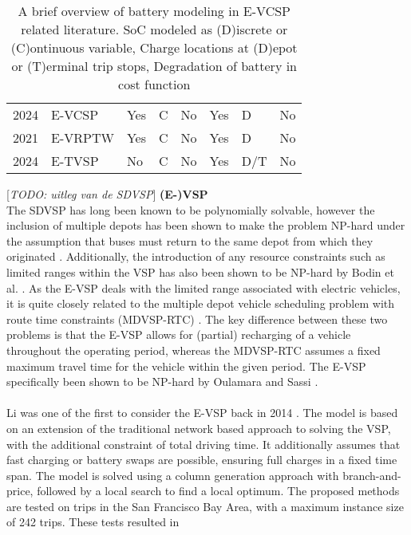 \documentclass[]{article}
\newcommand{\todo}[1]{{\color{red}[\textit{TODO: #1}]}}
\begin{document}
\begin{table}[]
\begin{tabular}{clllllll}
    \citet{Cong2024} 2024             & E-VCSP  & Yes & C   & No            & Yes         & D            & No          \\
    \addlinespace[0.4em]
    \citet{Ham2021} 2021              & E-VRPTW & Yes & C   & No            & Yes         & D            & No          \\
    \citet{Stadnichuk2024} 2024       & E-TVSP  & No  & C   & No            & Yes         & D/T          & No          \\
    \bottomrule
  \end{tabular}
  \caption{A brief overview of battery modeling in E-VCSP related literature. SoC modeled as (D)iscrete or (C)ontinuous variable, Charge locations at (D)epot or (T)erminal trip stops, Degradation of battery in cost function}
  \label{tab:eVCSP-lit}
\end{table}
\todo{uitleg van de SDVSP}
\noindent \textbf{(E-)VSP} \\
The SDVSP has long been known to be polynomially solvable, however the inclusion of
multiple depots has been shown to make the problem NP-hard under the assumption
that buses must return to the same depot from which they originated
\citet{Bunte2009}. Additionally, the introduction of any resource constraints
such as limited ranges within the VSP has also been shown to be NP-hard by
Bodin et al. \citet{Bodin1983}. As the E-VSP deals with the limited range
associated with electric vehicles, it is quite closely related to the multiple
depot vehicle scheduling problem with route time constraints (MDVSP-RTC)
\citet{Haghani2002}. The key difference between these two problems is that the
E-VSP allows for (partial) recharging of a vehicle throughout the operating
period, whereas the MDVSP-RTC assumes a fixed maximum travel time for the
vehicle within the given period. The E-VSP specifically been shown to be
NP-hard by Oulamara and Sassi \citet{Sassi2014}. \\\\
Li was one of the first to consider the E-VSP back in 2014 \citet{Li2014}. The
model is based on an extension of the traditional network based approach to
solving the VSP, with the additional constraint of total driving time. It
additionally assumes that fast charging or battery swaps are possible, ensuring
full charges in a fixed time span. The model is solved using a column generation
approach with branch-and-price, followed by a local search to find a local
optimum. The proposed methods are tested on trips in the San Francisco Bay
Area, with a maximum instance size of 242 trips. These tests resulted in
\end{document}
